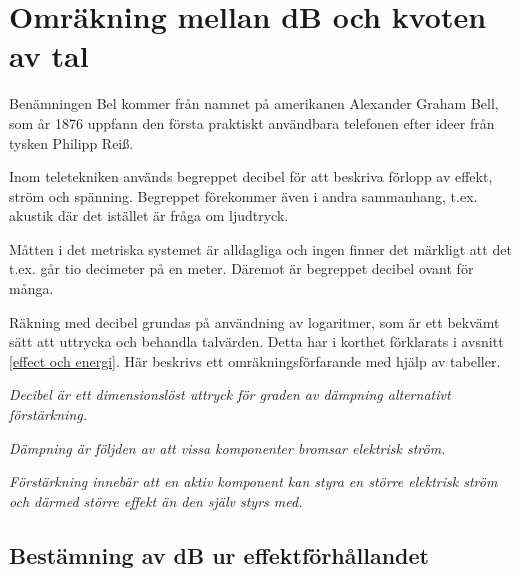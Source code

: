 \chapter{Omräkning mellan dB och kvoten av tal}
\label{decibel}

Benämningen Bel kommer från namnet på amerikanen Alexander Graham
Bell, som år 1876 uppfann den första praktiskt användbara telefonen
efter ideer från tysken Philipp Reiß.

Inom teletekniken används begreppet decibel för att beskriva förlopp
av effekt, ström och spänning. Begreppet förekommer även i andra
sammanhang, t.ex. akustik där det istället är fråga om ljudtryck.

Måtten i det metriska systemet är alldagliga och ingen finner det
märkligt att det t.ex. går tio decimeter på en meter. Däremot är
begreppet decibel ovant för många.

Räkning med decibel grundas på användning av logaritmer, som är ett
bekvämt sätt att uttrycka och behandla talvärden. Detta har i
korthet förklarats i avsnitt \ref{effect och energi}. Här beskrivs ett
omräkningsförfarande med hjälp av tabeller.

\emph{Decibel är ett dimensionslöst uttryck för graden av dämpning
  alternativt förstärkning.}

\emph{Dämpning är följden av att vissa komponenter bromsar elektrisk
  ström.}

\emph{Förstärkning innebär att en aktiv komponent kan styra en större
  elektrisk ström och därmed större effekt än den själv styrs med.}

\section{Bestämning av dB ur effektförhållandet}

